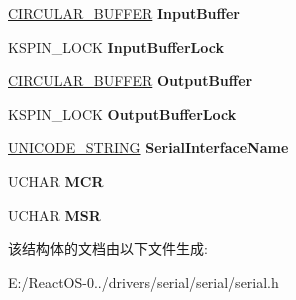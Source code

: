 \begin{DoxyCompactItemize}
\hyperlink{struct___c_i_r_c_u_l_a_r___b_u_f_f_e_r}{C\+I\+R\+C\+U\+L\+A\+R\+\_\+\+B\+U\+F\+F\+ER} {\bfseries Input\+Buffer}
\item 
\mbox{\label{struct___s_e_r_i_a_l___d_e_v_i_c_e___e_x_t_e_n_s_i_o_n_a2b7c4cc8d82a3416ad5ad12f922db048}} 
K\+S\+P\+I\+N\+\_\+\+L\+O\+CK {\bfseries Input\+Buffer\+Lock}
\item 
\mbox{\label{struct___s_e_r_i_a_l___d_e_v_i_c_e___e_x_t_e_n_s_i_o_n_abd22c2b3eab0ba0939d8b3bb73688195}} 
\hyperlink{struct___c_i_r_c_u_l_a_r___b_u_f_f_e_r}{C\+I\+R\+C\+U\+L\+A\+R\+\_\+\+B\+U\+F\+F\+ER} {\bfseries Output\+Buffer}
\item 
\mbox{\label{struct___s_e_r_i_a_l___d_e_v_i_c_e___e_x_t_e_n_s_i_o_n_a178cebb71473de62f647cd38c817a84f}} 
K\+S\+P\+I\+N\+\_\+\+L\+O\+CK {\bfseries Output\+Buffer\+Lock}
\item 
\mbox{\label{struct___s_e_r_i_a_l___d_e_v_i_c_e___e_x_t_e_n_s_i_o_n_a9bb218b3d81543b58bfb5b1465465c22}} 
\hyperlink{struct___u_n_i_c_o_d_e___s_t_r_i_n_g}{U\+N\+I\+C\+O\+D\+E\+\_\+\+S\+T\+R\+I\+NG} {\bfseries Serial\+Interface\+Name}
\item 
\mbox{\label{struct___s_e_r_i_a_l___d_e_v_i_c_e___e_x_t_e_n_s_i_o_n_ad526b5b3422e19ca81850ba6360fde3e}} 
U\+C\+H\+AR {\bfseries M\+CR}
\item 
\mbox{\label{struct___s_e_r_i_a_l___d_e_v_i_c_e___e_x_t_e_n_s_i_o_n_a6ea3b42dda9c721b9b475e78058a68c5}} 
U\+C\+H\+AR {\bfseries M\+SR}
\end{DoxyCompactItemize}


该结构体的文档由以下文件生成\+:\begin{DoxyCompactItemize}
\item 
E\+:/\+React\+O\+S-\/0../drivers/serial/serial/serial.\+h\end{DoxyCompactItemize}
